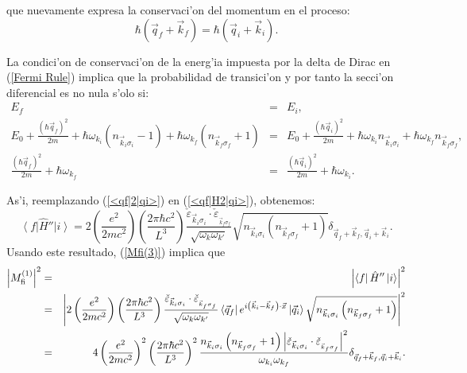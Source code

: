 que nuevamente expresa la conservaci'on del momentum en el proceso:
\begin{equation}
\hbar\left( \vec{q}_f+\vec{k}_f\right) =\hbar\left( \vec{q}_i+\vec
{k}_i\right) .\label{Conservacion Momentum 2}%
\end{equation}

La condici'on de conservaci'on de la energ'ia impuesta por la delta de Dirac
en (\ref{Fermi Rule}) implica que la probabilidad de transici'on y por tanto la
secci'on diferencial es no nula s'olo si:
\begin{eqnarray}
E_f & = &E_i,\\
E_0+\frac{\left( \hbar\vec{q}_f\right)^2}{2m}+\hbar\omega_{k_i}(n_{\vec
{k}_i\sigma_i}-1)+\hbar\omega_{k_f}(n_{\vec{k}_f\sigma_f}+1) & =
&E_0+\frac{\left( \hbar\vec{q}_i\right)
^2}{2m}+\hbar\omega_{k_i}n_{\vec{k}_i\sigma_i}+\hbar\omega_{k_f%
}n_{\vec{k}_f\sigma_f} ,\\
\frac{\left( \hbar\vec{q}_f\right)^2}{2m}+\hbar\omega_{k_f} &
=&\frac{\left( \hbar\vec{q}_i\right)
^2}{2m}+\hbar\omega_{k_i}.\label{Conservacion Energia 2}
\end{eqnarray}


As'i, reemplazando (\ref{<qf|2|qi>}) en (\ref{<qf|H2|qi>}), obtenemos:%
\begin{equation}
\left\langle f\right| \hat{H}''\left| i\right\rangle 
=2\left( \frac{e^2}{2mc^2}\right) \left( \frac{2\pi\hbar c^2}{L^3%
}\right) \frac{\check{\varepsilon}_{\vec{k}_i\sigma_i}\cdot
\check{\varepsilon}_{_{\vec{k}_f\sigma_f}}}{\sqrt{\omega_k\omega_{k'}}}
\sqrt{n_{\vec{k}_i\sigma_i}\left( n_{\vec{k}_f\sigma_f}+1\right)
}\delta_{\vec{q}_f+\vec{k}_f,\vec{q}_i+\vec{k}_i}.\label{<f|H2|i>} %
\end{equation}
Usando este resultado, (\ref{Mfi(3)}) implica que
\begin{eqnarray}
\left| M_{\rm fi}^{\left( 1\right) }\right|^2 & = &\left|
\left\langle f\right| \hat{H}''\left| i\right\rangle 
\right|^2\\
& = &\left| 2\left( \frac{e^2}{2mc^2}\right) \left( \frac{2\pi\hbar
c^2}{L^3}\right) \frac{\check{\varepsilon}_{\vec{k}_i\sigma_i}%
\cdot\check{\varepsilon}_{_{\vec{k}_f\sigma_f}}}{\sqrt{\omega_k\omega_{k'}
}}\left\langle \vec{q}_f\right| e^{i\left( \vec{k}_i-\vec{k}%
_f\right) \cdot\vec{x}}\left| \vec{q}_i\right\rangle  \sqrt{n_{\vec
{k}_i\sigma_i}\left( n_{\vec{k}_f\sigma_f}+1\right) }\right|
^2\\
& = &4\left( \frac{e^2}{2mc^2}\right)^2\left( \frac{2\pi\hbar c^2%
}{L^3}\right)^2\frac{n_{\vec{k}_i\sigma_i}\left( n_{\vec{k}%
_f\sigma_f}+1\right) \left| \check{\varepsilon}_{\vec{k}_i%
\sigma_i}\cdot\check{\varepsilon}_{_{\vec{k}_f\sigma_f}}\right|
^2}{\omega_{k_i}\omega_{k_f}}\delta_{\vec{q}_f+\vec{k}_f,\vec{q}%
_i+\vec{k}_i}.
\end{eqnarray}


